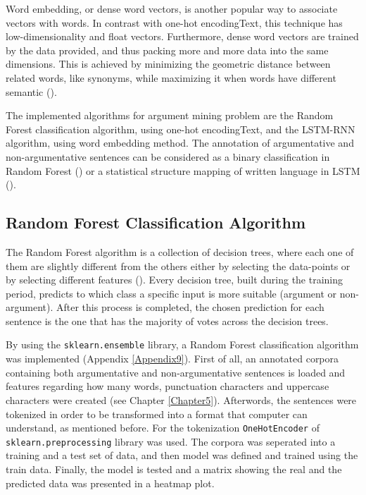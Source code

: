 Word embedding, or dense word vectors, is another popular way to associate vectors with words. In contrast with one-hot encodingText, this technique has low-dimensionality and float vectors. Furthermore, dense word vectors are trained by the data provided, and thus packing more and more data into the same dimensions. This is achieved by minimizing the geometric distance between related words, like synonyms, while maximizing it when words have different semantic (\cite{Chollet2017}).

The implemented algorithms for argument mining problem are the Random Forest classification algorithm, using one-hot encodingText, and the LSTM-RNN algorithm, using word embedding method. The annotation of argumentative and non-argumentative sentences can be considered as a binary classification in Random Forest (\cite{Stab2014}) or a statistical structure mapping of written language in LSTM (\cite{Chollet2017}).

\subsection{Random Forest Classification Algorithm}

The Random Forest algorithm is a collection of decision trees, where each one of them are slightly different from the others either by selecting the data-points or by selecting different features (\cite{Muller}). Every decision tree, built during the training period, predicts to which class a specific input is more suitable (argument or non-argument). After this process is completed, the chosen prediction for each sentence is the one that has the majority of votes across the decision trees. \cite{Chollet2017}

By using the \texttt{sklearn.ensemble} library, a Random Forest classification algorithm was implemented (Appendix \ref{Appendix9}). First of all, an annotated corpora containing both argumentative and non-argumentative sentences is loaded and features regarding how many words, punctuation characters and uppercase characters were created (see Chapter \ref{Chapter5}). Afterwords, the sentences were tokenized in order to be transformed into a format that computer can understand, as mentioned before. For the tokenization \texttt{OneHotEncoder} of \texttt{sklearn.preprocessing} library was used. The corpora was seperated into a training and a test set of data, and then model was defined and trained using the train data. Finally, the model is tested and a matrix showing the real and the predicted data was presented in a heatmap plot.


